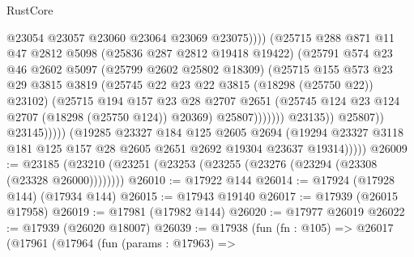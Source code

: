 \begin{lexlean}{RustCore}
\begin{coremodule}
                                          @23054
                                          @23057
                                          @23060
                                          @23064
                                          @23069
                                          @23075))))
                                  (@25715
                                    @288
                                    @871
                                    @11
                                    @47
                                    @2812
                                    @5098
                                    (@25836 @287 @2812 @19418 @19422)
                                    (@25791
                                      @574
                                      @23
                                      @46
                                      @2602
                                      @5097
                                      (@25799 @2602 @25802 @18309)
                                      (@25715
                                        @155
                                        @573
                                        @23
                                        @29
                                        @3815
                                        @3819
                                        (@25745 @22 @23 @22 @3815 (@18298 (@25750 @22)) @23102)
                                        (@25715
                                          @194
                                          @157
                                          @23
                                          @28
                                          @2707
                                          @2651
                                          (@25745 @124 @23 @124 @2707 (@18298 (@25750 @124)) @20369)
                                          @25807)))))))
                            @23135))
                        @25807))
                    @23145)))))
          (@19285
            @23327
            @184
            @125
            @2605
            @2694
            (@19294 @23327 @3118 @181 @125 @157 @28 @2605 @2651 @2692 @19304 @23637 @19314)))))
@26009 := @23185 (@23210 (@23251 (@23253 (@23255 (@23276 (@23294 (@23308 (@23328 @26000))))))))
@26010 := @17922 @144
@26014 := @17924 (@17928 @144) (@17934 @144)
@26015 := @17943 @19140
@26017 := @17939 (@26015 @17958)
@26019 := @17981 (@17982 @144)
@26020 := @17977 @26019
@26022 := @17939 (@26020 @18007)
@26039 := @17938
    (fun (fn : @105) =>
    @26017
      (@17961
        (@17964
          (fun (params : @17963) =>

\end{coremodule}
\end{lexlean}
